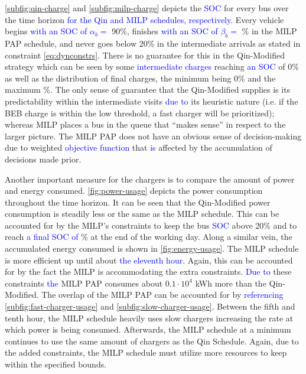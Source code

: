 \documentclass[utf8]{FrontiersinHarvard}
\newcommand{\bcharge}{0.7 }                                                     %
\newcommand{\mincharge}{20\% }                                                  %
\newcommand{\batsize}{388 }                                                     %
\begin{document}
\autoref{subfig:qin-charge} and \autoref{subfig:milp-charge} depicts the \textcolor{blue}{SOC} for every bus
over the time horizon \textcolor{blue}{for the Qin and MILP schedules, respectively}. Every vehicle begins
\textcolor{blue}{with an SOC of $\alpha_b = $} 90\%, finishes \textcolor{blue}{with an SOC of $\beta_b =$}
\fpeval{\bcharge *100}\% in the MILP PAP schedule, and never goes below \mincharge in the intermediate arrivals as stated
in constraint \autoref{eq:dynconstrs}. There is no guarantee for this in the Qin-Modified strategy which can be seen by
some \textcolor{blue}{intermediate charges} reaching \textcolor{blue}{an SOC} of 0\% as well as the
distribution of final charges, the minimum being 0\% and the maximum \fpeval{trunc(\fpeval{368 / \batsize * 100}, 3)}\%. The only sense of guarantee that the Qin-Modified supplies is its predictability within the intermediate
visits \textcolor{blue}{due to} its heuristic nature (i.e. if the BEB charge is within the low threshold, a
fast charger will be prioritized); whereas MILP places a bus in the queue that ``makes sense'' in respect to the larger
picture. The MILP PAP does not have an obvious sense of decision-making due to weighted
\textcolor{blue}{objective function} that \textcolor{blue}{is} affected by the accumulation of
decisions made prior.

Another important measure for the chargers is to compare the amount of power and energy consumed.
\autoref{fig:power-usage} depicts the power consumption throughout the time horizon. It can be seen that the
Qin-Modified power consumption is steadily less or the same as the MILP schedule. This can be accounted for by the
MILP's constraints to keep the bus \textcolor{blue}{SOC} above \mincharge and to reach
\textcolor{blue}{a final SOC of} \fpeval{\bcharge *100}\% at the end of the working day. Along a similar vein,
the accumulated energy consumed is shown in \autoref{fig:energy-usage}. The MILP schedule is more efficient up until
about \textcolor{blue}{the eleventh hour}. Again, this can be accounted for by the fact the MILP is
accommodating the extra constraints. \textcolor{blue}{Due to} these constraints
\textcolor{blue}{the} MILP PAP consumes about \(0.1\cdot10^4\) kWh more than the Qin-Modified. The overlap of the
MILP PAP can be accounted for by \textcolor{blue}{referencing} \autoref{subfig:fast-charger-usage} and
\autoref{subfig:slow-charger-usage}. Between the fifth and tenth hour, the MILP schedule heavily uses slow chargers
increasing the rate at which power is being consumed. Afterwards, the MILP schedule at a minimum continues to use the
same amount of chargers as the Qin Schedule. Again, due to the added constraints, the MILP schedule must utilize more
resources to keep within the specified bounds.
\end{document}
